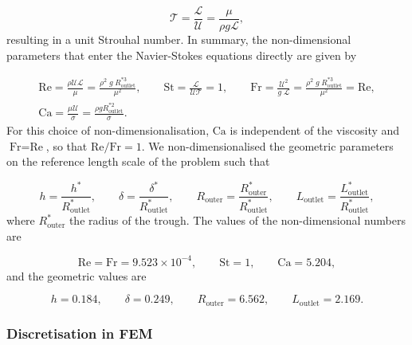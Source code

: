 \documentclass[aip,graphicx]{revtex4-1}
\newcommand{\sym}[1]{\text{#1}}
\begin{document}
\begin{equation}
 \mathcal{T} = \frac{\mathcal{L}}{\mathcal{U}} = \frac{\mu}{\rho g \mathcal{L}},
 \label{eqn:time_scale}
\end{equation}
resulting in a unit Strouhal number.
In summary, the non-dimensional parameters that enter the Navier-Stokes equations directly are given by

\begin{gather}
 \sym{Re} = \frac{\rho \mathcal{U L}}{\mu} = \frac{\rho^2 \; g \; R_{\sym{outlet}}^{*3}}{\mu^2}, \qquad \sym{St} = \frac{\mathcal{L}}{\mathcal{U} \mathcal{T}} = 1, \qquad \sym{Fr} = \frac{\mathcal{U}^2}{g \; \mathcal{L}} = \frac{\rho^2 \; g \; R_{\sym{outlet}}^{*3}}{\mu^2} = \sym{Re}, \nonumber \\[0.75cm]
 \sym{Ca} = \frac{\mu \mathcal{U}}{\sigma} = \frac{\rho g R_{\sym{outlet}}^{*2}}{\sigma}.
 \label{eqn:nondim_numbers}
\end{gather}
For this choice of non-dimensionalisation, $\sym{Ca}$ is independent of the viscosity and $\sym{Fr}=\sym{Re}$, so that $\sym{Re}/\sym{Fr} = 1$.
We non-dimensionalised the geometric parameters on the reference length scale of the problem such that

\begin{equation}
 h = \frac{h^*}{R_{\sym{outlet}}^*}, \qquad \delta = \frac{\delta^*}{R_{\sym{outlet}}^*}, \qquad R_{\sym{outer}} = \frac{R_{\sym{outer}}^*}{R_{\sym{outlet}}^*}, \qquad L_{\sym{outlet}} = \frac{L_{\sym{outlet}}^*}{R_{\sym{outlet}}^*},
\end{equation}
where $R_{\sym{outer}}^*$ the radius of the trough.
The values of the non-dimensional numbers are

\begin{equation}
 \sym{Re} = \sym{Fr} = 9.523 \times 10^{-4}, \qquad \sym{St}=1, \qquad \sym{Ca}=5.204,
\end{equation}
and the geometric values are

\begin{equation}
 h = 0.184, \qquad \delta=0.249, \qquad R_{\sym{outer}}=6.562, \qquad L_{\sym{outlet}}=2.169.
\end{equation}

\subsubsection{Discretisation in FEM}
\end{document}
